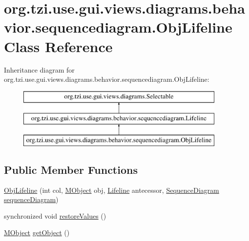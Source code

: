 \hypertarget{classorg_1_1tzi_1_1use_1_1gui_1_1views_1_1diagrams_1_1behavior_1_1sequencediagram_1_1_obj_lifeline}{\section{org.\-tzi.\-use.\-gui.\-views.\-diagrams.\-behavior.\-sequencediagram.\-Obj\-Lifeline Class Reference}
\label{classorg_1_1tzi_1_1use_1_1gui_1_1views_1_1diagrams_1_1behavior_1_1sequencediagram_1_1_obj_lifeline}
}
Inheritance diagram for org.\-tzi.\-use.\-gui.\-views.\-diagrams.\-behavior.\-sequencediagram.\-Obj\-Lifeline\-:\begin{figure}[H]
\begin{center}
\leavevmode
\includegraphics[height=3.000000cm]{classorg_1_1tzi_1_1use_1_1gui_1_1views_1_1diagrams_1_1behavior_1_1sequencediagram_1_1_obj_lifeline}
\end{center}
\end{figure}
\subsection*{Public Member Functions}
\begin{DoxyCompactItemize}
\item 
\hyperlink{classorg_1_1tzi_1_1use_1_1gui_1_1views_1_1diagrams_1_1behavior_1_1sequencediagram_1_1_obj_lifeline_aa35b0147b1c04afed93b2d83ce3f9c0f}{Obj\-Lifeline} (int col, \hyperlink{interfaceorg_1_1tzi_1_1use_1_1uml_1_1sys_1_1_m_object}{M\-Object} obj, \hyperlink{classorg_1_1tzi_1_1use_1_1gui_1_1views_1_1diagrams_1_1behavior_1_1sequencediagram_1_1_lifeline}{Lifeline} antecessor, \hyperlink{classorg_1_1tzi_1_1use_1_1gui_1_1views_1_1diagrams_1_1behavior_1_1sequencediagram_1_1_sequence_diagram}{Sequence\-Diagram} \hyperlink{classorg_1_1tzi_1_1use_1_1gui_1_1views_1_1diagrams_1_1behavior_1_1sequencediagram_1_1_lifeline_ac6ee70b06590bcc61128a0d044dfe882}{sequence\-Diagram})
\item 
synchronized void \hyperlink{classorg_1_1tzi_1_1use_1_1gui_1_1views_1_1diagrams_1_1behavior_1_1sequencediagram_1_1_obj_lifeline_ae1b124f94f39f5577ef3cfabf87ae6dd}{restore\-Values} ()
\item 
\hyperlink{interfaceorg_1_1tzi_1_1use_1_1uml_1_1sys_1_1_m_object}{M\-Object} \hyperlink{classorg_1_1tzi_1_1use_1_1gui_1_1views_1_1diagrams_1_1behavior_1_1sequencediagram_1_1_obj_lifeline_a2e4a52ac3446a879f4f2f0d87bf89fa1}{get\-Object} ()
\end{DoxyCompactItemize}
